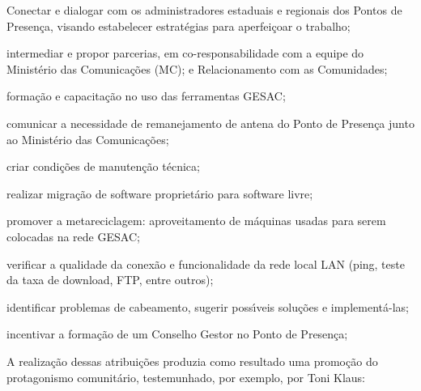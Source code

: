 \documentclass[
12pt,		%
openright,	%
twoside,  %
a4paper,			%
chapter=TITLE,		%
english,			%
french,				%
spanish,			%
brazil				%
]{USPSC-classe/USPSC}
\begin{document}
\begin{alineas}
\item Conectar e dialogar com os administradores estaduais e regionais dos Pontos de Presen\c{c}a, visando estabelecer estrat\'egias para aperfei\c{c}oar o trabalho;
\item intermediar e propor parcerias, em co-responsabilidade com a equipe do Minist\'erio das Comunica\c{c}\~oes (MC); e Relacionamento com as Comunidades;
\item forma\c{c}\~ao e capacita\c{c}\~ao no uso das ferramentas GESAC;
\item comunicar a  necessidade de remanejamento de antena  do Ponto de Presen\c{c}a junto ao Minist\'erio das Comunica\c{c}\~oes;
\item criar condi\c{c}\~oes de manuten\c{c}\~ao t\'ecnica;
\item realizar migra\c{c}\~ao de software propriet\'ario para software livre;
\item promover a metareciclagem: aproveitamento de m\'aquinas usadas para serem colocadas na rede GESAC;
\item verificar a qualidade da conex\~ao e  funcionalidade da rede local LAN (ping, teste da taxa de download, FTP, entre outros);
\item identificar problemas de cabeamento, sugerir poss\'{\i}veis solu\c{c}\~oes e implement\'a-las;
\item incentivar a forma\c{c}\~ao de um Conselho Gestor no Ponto de Presen\c{c}a;
\end{alineas}

A realiza\c{c}\~ao dessas atribui\c{c}\~oes produzia como resultado uma promo\c{c}\~ao do protagonismo comunit\'ario, testemunhado, por exemplo, por Toni Klaus:











\noindent\begin{center}\mbox{\centering{}}\end{center}
\end{document}
